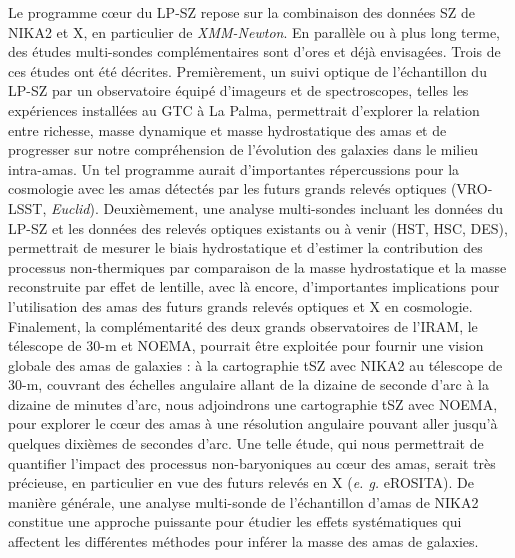 Le programme c\oe ur du LP-SZ repose sur la combinaison des données SZ de NIKA2 et X, en particulier de \emph{XMM-Newton}. En parallèle ou à plus long terme, des études multi-sondes complémentaires sont d'ores et déjà envisagées. Trois de ces études ont été décrites. Premièrement, un suivi optique de l'échantillon du LP-SZ par un observatoire équipé d'imageurs et de spectroscopes, telles les expériences installées au GTC à La Palma, permettrait d'explorer la relation entre richesse, masse dynamique et masse hydrostatique des amas et de progresser sur notre compréhension de l'évolution des galaxies dans le milieu intra-amas. Un tel programme aurait d'importantes répercussions pour la cosmologie avec les amas détectés par les futurs grands relevés optiques (VRO-LSST, \emph{Euclid}). Deuxièmement, une analyse multi-sondes incluant les données du LP-SZ et les données des relevés optiques existants ou à venir (HST, HSC, DES), permettrait de mesurer le biais hydrostatique et d'estimer la contribution des processus non-thermiques par comparaison de la masse hydrostatique et la masse reconstruite par effet de lentille, avec là encore, d'importantes implications pour l'utilisation des amas des futurs grands relevés optiques et X en cosmologie. Finalement, la complémentarité des deux grands observatoires de l'IRAM, le télescope de 30-m  et NOEMA, pourrait être exploitée pour fournir une vision globale des amas de galaxies : à la cartographie tSZ avec NIKA2 au télescope de 30-m, couvrant des échelles angulaire allant de la dizaine de seconde d'arc à la dizaine de minutes d'arc, nous adjoindrons une cartographie tSZ avec NOEMA, pour explorer le c\oe ur des amas à une résolution angulaire pouvant aller jusqu'à quelques dixièmes de secondes d'arc. Une telle étude, qui nous permettrait de quantifier l'impact des processus non-baryoniques au c\oe ur des amas, serait très précieuse, en particulier en vue des futurs relevés en X (\emph{e. g. } eROSITA). De manière générale, une analyse multi-sonde de l'échantillon d'amas de NIKA2 constitue une approche puissante pour étudier les effets systématiques qui affectent les différentes méthodes pour inférer la masse des amas de galaxies. 

